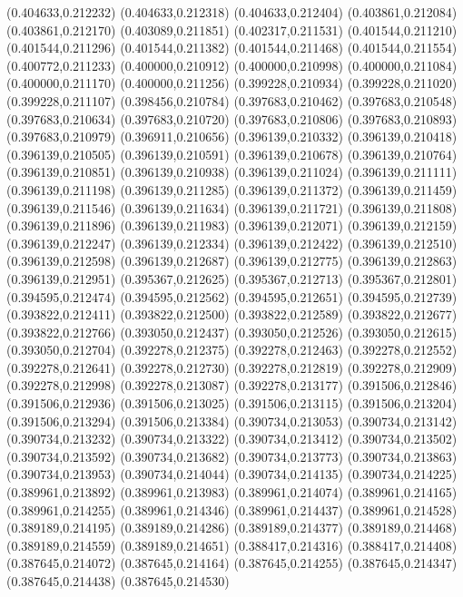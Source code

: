 (0.404633,0.212232)
(0.404633,0.212318)
(0.404633,0.212404)
(0.403861,0.212084)
(0.403861,0.212170)
(0.403089,0.211851)
(0.402317,0.211531)
(0.401544,0.211210)
(0.401544,0.211296)
(0.401544,0.211382)
(0.401544,0.211468)
(0.401544,0.211554)
(0.400772,0.211233)
(0.400000,0.210912)
(0.400000,0.210998)
(0.400000,0.211084)
(0.400000,0.211170)
(0.400000,0.211256)
(0.399228,0.210934)
(0.399228,0.211020)
(0.399228,0.211107)
(0.398456,0.210784)
(0.397683,0.210462)
(0.397683,0.210548)
(0.397683,0.210634)
(0.397683,0.210720)
(0.397683,0.210806)
(0.397683,0.210893)
(0.397683,0.210979)
(0.396911,0.210656)
(0.396139,0.210332)
(0.396139,0.210418)
(0.396139,0.210505)
(0.396139,0.210591)
(0.396139,0.210678)
(0.396139,0.210764)
(0.396139,0.210851)
(0.396139,0.210938)
(0.396139,0.211024)
(0.396139,0.211111)
(0.396139,0.211198)
(0.396139,0.211285)
(0.396139,0.211372)
(0.396139,0.211459)
(0.396139,0.211546)
(0.396139,0.211634)
(0.396139,0.211721)
(0.396139,0.211808)
(0.396139,0.211896)
(0.396139,0.211983)
(0.396139,0.212071)
(0.396139,0.212159)
(0.396139,0.212247)
(0.396139,0.212334)
(0.396139,0.212422)
(0.396139,0.212510)
(0.396139,0.212598)
(0.396139,0.212687)
(0.396139,0.212775)
(0.396139,0.212863)
(0.396139,0.212951)
(0.395367,0.212625)
(0.395367,0.212713)
(0.395367,0.212801)
(0.394595,0.212474)
(0.394595,0.212562)
(0.394595,0.212651)
(0.394595,0.212739)
(0.393822,0.212411)
(0.393822,0.212500)
(0.393822,0.212589)
(0.393822,0.212677)
(0.393822,0.212766)
(0.393050,0.212437)
(0.393050,0.212526)
(0.393050,0.212615)
(0.393050,0.212704)
(0.392278,0.212375)
(0.392278,0.212463)
(0.392278,0.212552)
(0.392278,0.212641)
(0.392278,0.212730)
(0.392278,0.212819)
(0.392278,0.212909)
(0.392278,0.212998)
(0.392278,0.213087)
(0.392278,0.213177)
(0.391506,0.212846)
(0.391506,0.212936)
(0.391506,0.213025)
(0.391506,0.213115)
(0.391506,0.213204)
(0.391506,0.213294)
(0.391506,0.213384)
(0.390734,0.213053)
(0.390734,0.213142)
(0.390734,0.213232)
(0.390734,0.213322)
(0.390734,0.213412)
(0.390734,0.213502)
(0.390734,0.213592)
(0.390734,0.213682)
(0.390734,0.213773)
(0.390734,0.213863)
(0.390734,0.213953)
(0.390734,0.214044)
(0.390734,0.214135)
(0.390734,0.214225)
(0.389961,0.213892)
(0.389961,0.213983)
(0.389961,0.214074)
(0.389961,0.214165)
(0.389961,0.214255)
(0.389961,0.214346)
(0.389961,0.214437)
(0.389961,0.214528)
(0.389189,0.214195)
(0.389189,0.214286)
(0.389189,0.214377)
(0.389189,0.214468)
(0.389189,0.214559)
(0.389189,0.214651)
(0.388417,0.214316)
(0.388417,0.214408)
(0.387645,0.214072)
(0.387645,0.214164)
(0.387645,0.214255)
(0.387645,0.214347)
(0.387645,0.214438)
(0.387645,0.214530)
